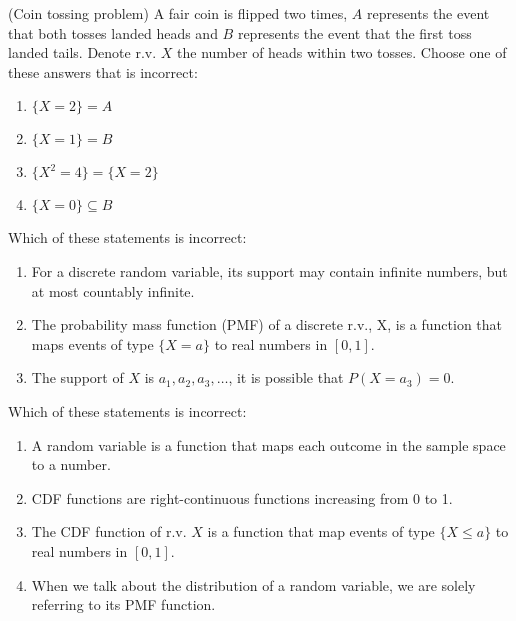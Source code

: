 \documentclass[poll_tutorial_format]{subfiles}
\begin{document}
	
	
	\begin{exercise}
		(Coin tossing problem) A fair coin is flipped two times, $A$ represents the event that both tosses landed heads and $B$ represents the event that the first toss landed tails. Denote r.v. $X$ the number of heads within two tosses.
		Choose one of these answers that is incorrect: 
		\begin{enumerate}
			\item $\{X=2\}=A$
			\item $ \{X=1\}=B$
			\item $\{X^2 =4\} =\{X=2\} $
			\item $ \{X=0\} \subseteq B$
		\end{enumerate}
	\end{exercise}
	
	
	
	\begin{exercise}
			Which of these statements is incorrect:
		\begin{enumerate}
			\item For a discrete random variable, its support may contain infinite numbers, but at most countably infinite.
			\item The probability mass function
			(PMF) of a discrete r.v., X, is a function that maps events of type $\{X=a\}$  to real numbers in $[0,1]$.
			\item The support of $X$ is $a_1, a_2, a_3, \dots$, it is possible that $P(X=a_{3})=0$.
		\end{enumerate}
	\end{exercise}
	
	
		\begin{exercise}
		Which of these statements is incorrect:
		\begin{enumerate}
			\item A random variable is a function that maps each outcome in the sample space to a number.  
			\item CDF functions are right-continuous functions increasing from 0 to 1.
			\item The CDF function of r.v. $X$ is a function that map events of type $\{X\leq a\}$ to real numbers in $[0,1]$.
			\item When we talk about the distribution of a random variable, we are solely referring to its PMF function.
		\end{enumerate}
	\end{exercise}
	
 		
		
\end{document}
